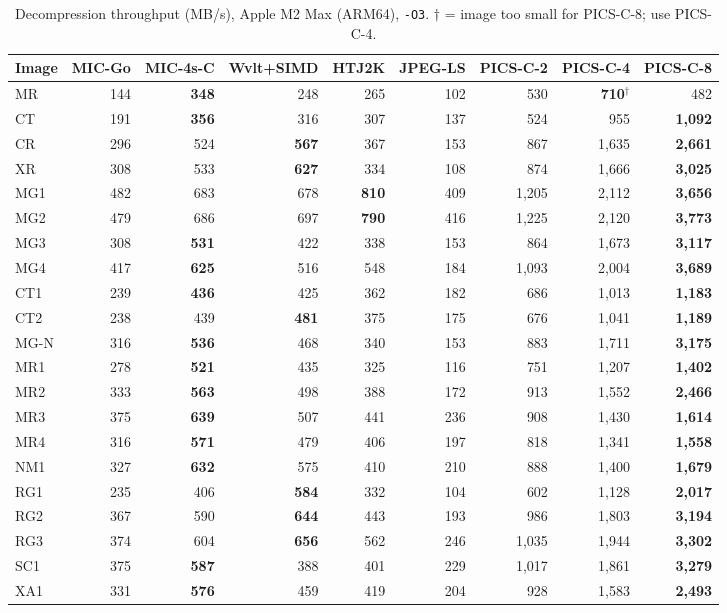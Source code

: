 \documentclass[journal]{IEEEtran}
\begin{document}
\begin{table}[t]
\centering
\caption{Decompression throughput (MB/s), Apple M2 Max (ARM64), \texttt{-O3}. $\dagger$ = image too small for PICS-C-8; use PICS-C-4.}
\label{tab:decomp-arm}
\begin{tabular}{lrrrrrrrr}
\toprule
Image & MIC-Go & MIC-4s-C & Wvlt+SIMD & HTJ2K & JPEG-LS & PICS-C-2 & PICS-C-4 & PICS-C-8 \\
\midrule
MR   & 144 & \textbf{348} & 248 & 265 & 102 & 530 & \textbf{710}$^\dagger$ & 482 \\
CT   & 191 & \textbf{356} & 316 & 307 & 137 & 524 & 955 & \textbf{1,092} \\
CR   & 296 & 524 & \textbf{567} & 367 & 153 & 867 & 1,635 & \textbf{2,661} \\
XR   & 308 & 533 & \textbf{627} & 334 & 108 & 874 & 1,666 & \textbf{3,025} \\
MG1  & 482 & 683 & 678 & \textbf{810} & 409 & 1,205 & 2,112 & \textbf{3,656} \\
MG2  & 479 & 686 & 697 & \textbf{790} & 416 & 1,225 & 2,120 & \textbf{3,773} \\
MG3  & 308 & \textbf{531} & 422 & 338 & 153 & 864 & 1,673 & \textbf{3,117} \\
MG4  & 417 & \textbf{625} & 516 & 548 & 184 & 1,093 & 2,004 & \textbf{3,689} \\
CT1  & 239 & \textbf{436} & 425 & 362 & 182 & 686 & 1,013 & \textbf{1,183} \\
CT2  & 238 & 439 & \textbf{481} & 375 & 175 & 676 & 1,041 & \textbf{1,189} \\
MG-N & 316 & \textbf{536} & 468 & 340 & 153 & 883 & 1,711 & \textbf{3,175} \\
MR1  & 278 & \textbf{521} & 435 & 325 & 116 & 751 & 1,207 & \textbf{1,402} \\
MR2  & 333 & \textbf{563} & 498 & 388 & 172 & 913 & 1,552 & \textbf{2,466} \\
MR3  & 375 & \textbf{639} & 507 & 441 & 236 & 908 & 1,430 & \textbf{1,614} \\
MR4  & 316 & \textbf{571} & 479 & 406 & 197 & 818 & 1,341 & \textbf{1,558} \\
NM1  & 327 & \textbf{632} & 575 & 410 & 210 & 888 & 1,400 & \textbf{1,679} \\
RG1  & 235 & 406 & \textbf{584} & 332 & 104 & 602 & 1,128 & \textbf{2,017} \\
RG2  & 367 & 590 & \textbf{644} & 443 & 193 & 986 & 1,803 & \textbf{3,194} \\
RG3  & 374 & 604 & \textbf{656} & 562 & 246 & 1,035 & 1,944 & \textbf{3,302} \\
SC1  & 375 & \textbf{587} & 388 & 401 & 229 & 1,017 & 1,861 & \textbf{3,279} \\
XA1  & 331 & \textbf{576} & 459 & 419 & 204 & 928 & 1,583 & \textbf{2,493} \\
\bottomrule
\end{tabular}
\end{table}
\end{document}
